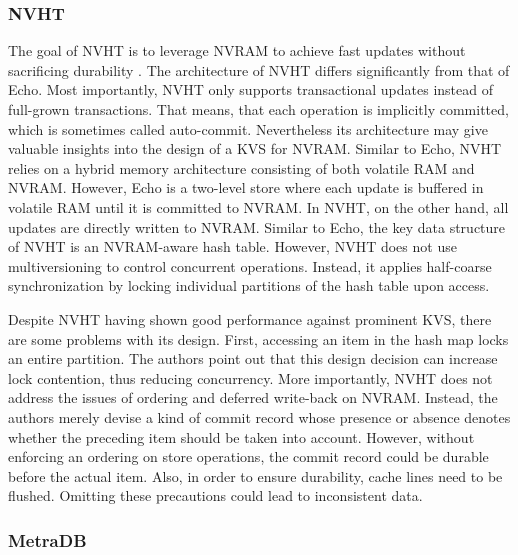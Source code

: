 \subsubsection{NVHT}

The goal of NVHT is to leverage \ac{NVRAM} to achieve fast updates without
sacrificing durability \cite{zhou2016nvht}. The architecture of NVHT differs
significantly from that of Echo. Most importantly, NVHT only supports
transactional updates instead of full-grown transactions. That means, that each
operation is implicitly committed, which is sometimes called auto-commit.
Nevertheless its architecture may give valuable insights into the design of a
\ac{KVS} for \ac{NVRAM}. Similar to Echo, NVHT relies on a hybrid memory
architecture consisting of both volatile \ac{RAM} and \ac{NVRAM}. However, Echo
is a two-level store where each update is buffered in volatile \ac{RAM} until it
is committed to \ac{NVRAM}. In NVHT, on the other hand, all updates are directly
written to \ac{NVRAM}. Similar to Echo, the key data structure of NVHT is an
\ac{NVRAM}-aware hash table. However, NVHT does not use multiversioning to
control concurrent operations. Instead, it applies half-coarse synchronization
by locking individual partitions of the hash table upon access.

Despite NVHT having shown good performance against prominent \ac{KVS}, there are
some problems with its design. First, accessing an item in the hash map locks an
entire partition. The authors point out that this design decision can increase
lock contention, thus reducing concurrency. More importantly, NVHT does not
address the issues of ordering and deferred write-back on \ac{NVRAM}. Instead,
the authors merely devise a kind of commit record whose presence or absence
denotes whether the preceding item should be taken into account. However,
without enforcing an ordering on store operations, the commit record could be
durable before the actual item. Also, in order to ensure durability, cache lines
need to be flushed. Omitting these precautions could lead to inconsistent data.

\subsubsection{MetraDB}

